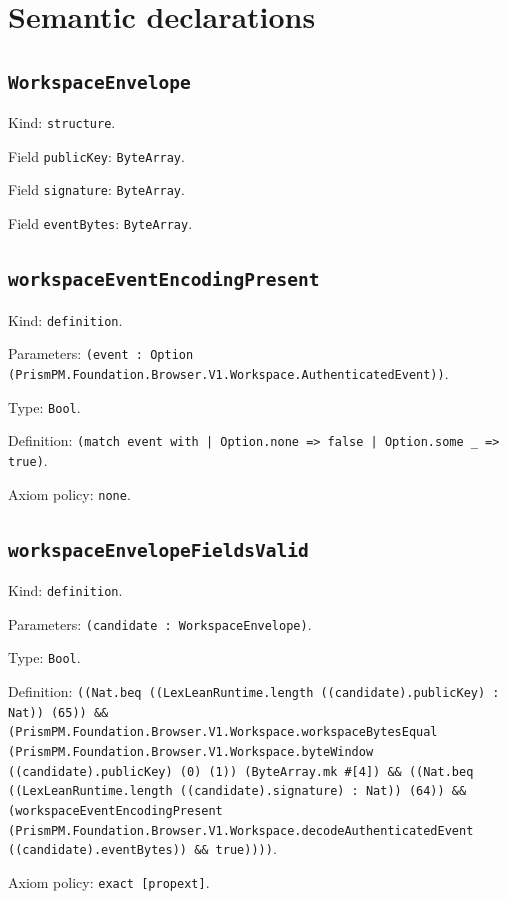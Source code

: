 \documentclass[11pt]{article}
\begin{document}
\section*{Semantic declarations}
\subsection*{\texttt{WorkspaceEnvelope}}
\noindent Kind: \texttt{structure}.\par
\noindent Field \texttt{publicKey}: \texttt{ByteArray}.\par
\noindent Field \texttt{signature}: \texttt{ByteArray}.\par
\noindent Field \texttt{eventBytes}: \texttt{ByteArray}.\par
\subsection*{\texttt{workspaceEventEncodingPresent}}
\noindent Kind: \texttt{definition}.\par
\noindent Parameters: \texttt{(event : Option (PrismPM.Foundation.Browser.V1.Workspace.AuthenticatedEvent))}.\par
\noindent Type: \texttt{Bool}.\par
\noindent Definition: \texttt{(match event with | Option.none => false | Option.some \_ => true)}.\par
\noindent Axiom policy: \texttt{none}.\par
\subsection*{\texttt{workspaceEnvelopeFieldsValid}}
\noindent Kind: \texttt{definition}.\par
\noindent Parameters: \texttt{(candidate : WorkspaceEnvelope)}.\par
\noindent Type: \texttt{Bool}.\par
\noindent Definition: \texttt{((Nat.beq ((LexLeanRuntime.length ((candidate).publicKey) : Nat)) (65)) \&\& (PrismPM.Foundation.Browser.V1.Workspace.workspaceBytesEqual (PrismPM.Foundation.Browser.V1.Workspace.byteWindow ((candidate).publicKey) (0) (1)) (ByteArray.mk \#[4]) \&\& ((Nat.beq ((LexLeanRuntime.length ((candidate).signature) : Nat)) (64)) \&\& (workspaceEventEncodingPresent (PrismPM.Foundation.Browser.V1.Workspace.decodeAuthenticatedEvent ((candidate).eventBytes)) \&\& true))))}.\par
\noindent Axiom policy: \texttt{exact [propext]}.\par
\end{document}
